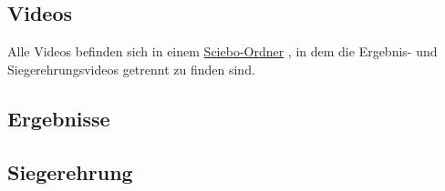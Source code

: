 \documentclass[a4paper, oneside,openany, 12pt, ngerman, listof=nochaptergap, bibliography=totoc,
,listof=totoc,listof=entryprefix,]{scrbook} %
\begin{document}
\setlength{\parindent}{0em} 


\begin{titlepage}

\end{titlepage}

\tableofcontents

\cleardoublepage


\newpage


\mainmatter














\begin{appendices}
\chapter{Videos}

Alle Videos befinden sich in einem
\href{https://uni-muenster.sciebo.de/s/FCpRRcPnGg2HgHa}{Sciebo-Ordner}
, in dem die Ergebnis- und Siegerehrungsvideos getrennt zu finden sind.
\section{Ergebnisse}
\section{Siegerehrung}
\end{appendices}

\backmatter








%
\end{document}
